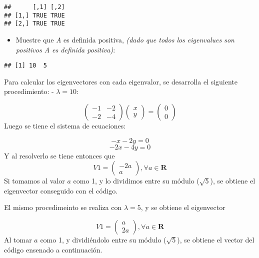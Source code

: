 \documentclass[
]{article}
\newenvironment{Shaded}{\begin{snugshade}}{\end{snugshade}}
\newcommand{\FunctionTok}[1]{\textcolor[rgb]{0.00,0.00,0.00}{#1}}
\newcommand{\NormalTok}[1]{#1}
\newcommand{\OtherTok}[1]{\textcolor[rgb]{0.56,0.35,0.01}{#1}}
\newcommand{\SpecialCharTok}[1]{\textcolor[rgb]{0.00,0.00,0.00}{#1}}
\providecommand{\tightlist}{%
  \setlength{\itemsep}{0pt}\setlength{\parskip}{0pt}}
\begin{document}
\begin{verbatim}
##      [,1] [,2]
## [1,] TRUE TRUE
## [2,] TRUE TRUE
\end{verbatim}

\begin{itemize}
\tightlist
\item
  Muestre que \emph{A} es definida positiva, \emph{(dado que todos los
  eigenvalues son positivos A es definida positiva)}:
\end{itemize}

\begin{Shaded}
\end{Shaded}

\begin{verbatim}
## [1] 10  5
\end{verbatim}

Para calcular los eigenvectores con cada eigenvalor, se desarrolla el
siguiente procedimiento: - \(\lambda =10\):

\[
\left(\begin{array}{cc} 
-1 & -2\\
-2 & -4
\end{array}\right)
\left(\begin{array}{cc} 
x\\ 
y
\end{array}\right) = 
\left(\begin{array}{cc} 
0\\ 
0
\end{array}\right)
\] Luego se tiene el sistema de ecuaciones:

\[
-x-2y = 0
\] \[
-2x-4y = 0
\] Y al resolverlo se tiene entonces que \[
V1 = \left(\begin{array}{cc} 
-2a\\
a
\end{array}\right), \forall a \in \mathbf{R}
\] Si tomamos al valor \(a\) como 1, y lo dividimos entre su módulo
(\(\sqrt{5}\)), se obtiene el eigenvector conseguido con el código.

El mismo procedimeinto se realiza con \(\lambda = 5\), y se obtiene el
eigenvector

\[
V1 = \left(\begin{array}{cc} 
a\\
2a
\end{array}\right), \forall a \in \mathbf{R}
\] Al tomar \(a\) como 1, y dividiéndolo entre su módulo (\(\sqrt{5}\)),
se obtiene el vector del código ensenado a continuación.
\end{document}
